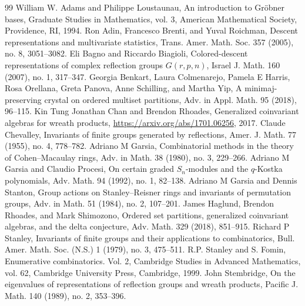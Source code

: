 \documentclass[10pt]{article}
\begin{document}
\nocite{*}
\begin{thebibliography}{99}
 William W. Adams and Philippe Loustaunau, An introduction to Gr\"obner bases, Graduate Studies in Mathematics, vol. 3, American Mathematical Society, Providence, RI, 1994.
 Ron Adin, Francesco Brenti, and Yuval Roichman, Descent representations and multivariate statistics, Trans. Amer. Math. Soc. 357 (2005), no. 8, 3051--3082.
 Eli Bagno and Riccardo Biagioli, Colored-descent representations of complex reflection groups $G(r,p,n)$, Israel J. Math. 160 (2007), no. 1, 317--347.
 Georgia Benkart, Laura Colmenarejo, Pamela E Harris, Rosa Orellana, Greta Panova, Anne Schilling, and Martha Yip, A minimaj-preserving crystal on ordered multiset partitions, Adv. in Appl. Math. 95 (2018), 96--115.
 Kin Tung Jonathan Chan and Brendon Rhoades, Generalized coinvariant algebras for wreath products, \url{https://arxiv.org/abs/1701.06256}, 2017.
 Claude Chevalley, Invariants of finite groups generated by reflections, Amer. J. Math. 77 (1955), no. 4, 778--782.
 Adriano M Garsia, Combinatorial methods in the theory of Cohen--Macaulay rings, Adv. in Math. 38 (1980), no. 3, 229--266.
 Adriano M Garsia and Claudio Procesi, On certain graded $S_n$-modules and the $q$-Kostka polynomials, Adv. Math. 94 (1992), no. 1, 82--138.
 Adriano M Garsia and Dennis Stanton, Group actions on Stanley--Reisner rings and invariants of permutation groups, Adv. in Math. 51 (1984), no. 2, 107--201.
 James Haglund, Brendon Rhoades, and Mark Shimozono, Ordered set partitions, generalized coinvariant algebras, and the delta conjecture, Adv. Math. 329 (2018), 851--915.
 Richard P Stanley, Invariants of finite groups and their applications to combinatorics, Bull. Amer. Math. Soc. (N.S.) 1 (1979), no. 3, 475--511.
 R.P. Stanley and S. Fomin, Enumerative combinatorics. Vol. 2, Cambridge Studies in Advanced Mathematics, vol. 62, Cambridge University Press, Cambridge, 1999.
 John Stembridge, On the eigenvalues of representations of reflection groups and wreath products, Pacific J. Math. 140 (1989), no. 2, 353--396.
\end{thebibliography}
\end{document}
